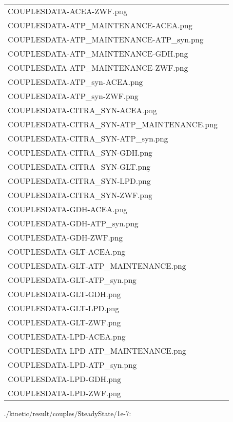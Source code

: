 \documentclass[a4paper, parskip=full]{scrreprt}
\begin{document}
\begin{longtable}{ll}
COUPLESDATA-ACEA-ZWF.png\\
COUPLESDATA-ATP\_MAINTENANCE-ACEA.png\\
COUPLESDATA-ATP\_MAINTENANCE-ATP\_syn.png\\
COUPLESDATA-ATP\_MAINTENANCE-GDH.png\\
COUPLESDATA-ATP\_MAINTENANCE-ZWF.png\\
COUPLESDATA-ATP\_syn-ACEA.png\\
COUPLESDATA-ATP\_syn-ZWF.png\\
COUPLESDATA-CITRA\_SYN-ACEA.png\\
COUPLESDATA-CITRA\_SYN-ATP\_MAINTENANCE.png\\
COUPLESDATA-CITRA\_SYN-ATP\_syn.png\\
COUPLESDATA-CITRA\_SYN-GDH.png\\
COUPLESDATA-CITRA\_SYN-GLT.png\\
COUPLESDATA-CITRA\_SYN-LPD.png\\
COUPLESDATA-CITRA\_SYN-ZWF.png\\
COUPLESDATA-GDH-ACEA.png\\
COUPLESDATA-GDH-ATP\_syn.png\\
COUPLESDATA-GDH-ZWF.png\\
COUPLESDATA-GLT-ACEA.png\\
COUPLESDATA-GLT-ATP\_MAINTENANCE.png\\
COUPLESDATA-GLT-ATP\_syn.png\\
COUPLESDATA-GLT-GDH.png\\
COUPLESDATA-GLT-LPD.png\\
COUPLESDATA-GLT-ZWF.png\\
COUPLESDATA-LPD-ACEA.png\\
COUPLESDATA-LPD-ATP\_MAINTENANCE.png\\
COUPLESDATA-LPD-ATP\_syn.png\\
COUPLESDATA-LPD-GDH.png\\
COUPLESDATA-LPD-ZWF.png\\
\end{longtable}

./kinetic/result/couples/SteadyState/1e-7:
\end{document}
